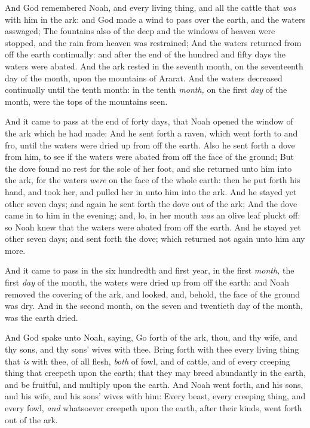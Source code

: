 \documentclass[11pt,letterpaper,oneside]{memoir}
\begin{document}
And God remembered Noah, and every living thing, and all the cattle that
\emph{was} with him in the ark: and God made a wind to pass over the
earth, and the waters asswaged; The fountains also of the deep and the
windows of heaven were stopped, and the rain from heaven was restrained;
And the waters returned from off the earth continually: and after the
end of the hundred and fifty days the waters were abated. And the ark
rested in the seventh month, on the seventeenth day of the month, upon
the mountains of Ararat. And the waters decreased continually until the
tenth month: in the tenth \emph{month,} on the first \emph{day} of the
month, were the tops of the mountains seen.

And it came to pass at the end of forty days, that Noah opened the
window of the ark which he had made: And he sent forth a raven, which
went forth to and fro, until the waters were dried up from off the
earth. Also he sent forth a dove from him, to see if the waters were
abated from off the face of the ground; But the dove found no rest for
the sole of her foot, and she returned unto him into the ark, for the
waters \emph{were} on the face of the whole earth: then he put forth his
hand, and took her, and pulled her in unto him into the ark. And he
stayed yet other seven days; and again he sent forth the dove out of the
ark; And the dove came in to him in the evening; and, lo, in her mouth
\emph{was} an olive leaf pluckt off: so Noah knew that the waters were
abated from off the earth. And he stayed yet other seven days; and sent
forth the dove; which returned not again unto him any more.

And it came to pass in the six hundredth and first year, in the first
\emph{month,} the first \emph{day} of the month, the waters were dried
up from off the earth: and Noah removed the covering of the ark, and
looked, and, behold, the face of the ground was dry. And in the second
month, on the seven and twentieth day of the month, was the earth dried.

And God spake unto Noah, saying, Go forth of the ark, thou, and thy
wife, and thy sons, and thy sons' wives with thee. Bring forth with thee
every living thing that \emph{is} with thee, of all flesh, \emph{both}
of fowl, and of cattle, and of every creeping thing that creepeth upon
the earth; that they may breed abundantly in the earth, and be fruitful,
and multiply upon the earth. And Noah went forth, and his sons, and his
wife, and his sons' wives with him: Every beast, every creeping thing,
and every fowl, \emph{and} whatsoever creepeth upon the earth, after
their kinds, went forth out of the ark.
\end{document}
